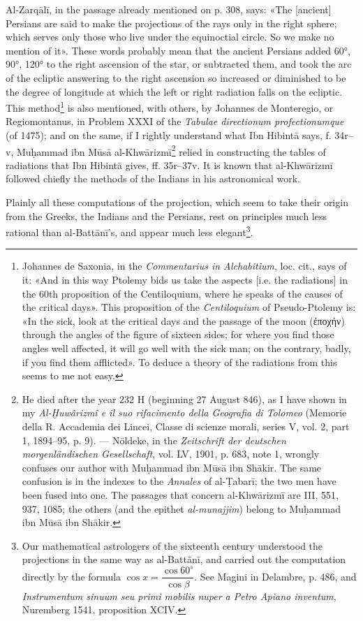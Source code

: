 \documentclass[11pt]{article}
\begin{document}
\par Al-Zarqālī, in the passage already mentioned on p. 308, says: «The [ancient] Persians are said to make the projections of the rays only in the right sphere; which serves only those who live under the equinoctial circle. So we make no mention of it». These words probably mean that the ancient Persians added 60°, 90°, 120° to the right ascension of the star, or subtracted them, and took the arc of the ecliptic answering to the right ascension so increased or diminished to be the degree of longitude at which the left or right radiation falls on the ecliptic. This method\footnote{Johannes de Saxonia, in the \emph{Commentarius in Alchabitium}, loc. cit., says of it: «And in this way Ptolemy bids us take the aspects [i.e. the radiations] in the 60th proposition of the Centiloquium, where he speaks of the causes of the critical days». This proposition of the \emph{Centiloquium} of Pseudo-Ptolemy is: «In the sick, look at the critical days and the passage of the moon ({\greekfont ἐποχήν}) through the angles of the figure of sixteen sides; for where you find those angles well affected, it will go well with the sick man; on the contrary, badly, if you find them afflicted». To deduce a theory of the radiations from this seems to me not easy.} is also mentioned, with others, by Johannes de Monteregio, or Regiomontanus, in Problem XXXI of the \emph{Tabulae directionum profectionumque} (of 1475); and on the same, if I rightly understand what Ibn Hibintā says, f. 34r–v, Muḥammad ibn Mūsā al-Khwārizmī\footnote{He died after the year 232 H (beginning 27 August 846), as I have shown in my \emph{Al-Ḫuwârizmî e il suo rifacimento della Geografia di Tolomeo} (Memorie della R. Accademia dei Lincei, Classe di scienze morali, series V, vol. 2, part 1, 1894–95, p. 9). — Nöldeke, in the \emph{Zeitschrift der deutschen morgenländischen Gesellschaft}, vol. LV, 1901, p. 683, note 1, wrongly confuses our author with Muḥammad ibn Mūsā ibn Shākir. The same confusion is in the indexes to the \emph{Annales} of al-Ṭabarī; the two men have been fused into one. The passages that concern al-Khwārizmī are III, 551, 937, 1085; the others (and the epithet \emph{al-munajjim}) belong to Muḥammad ibn Mūsā ibn Shākir.} relied in constructing the tables of radiations that Ibn Hibintā gives, ff. 35r–37v. It is known that al-Khwārizmī followed chiefly the methods of the Indians in his astronomical work.\par
\par Plainly all these computations of the projection, which seem to take their origin from the Greeks, the Indians and the Persians, rest on principles much less rational than al-Battānī's, and appear much less elegant\footnote{Our mathematical astrologers of the sixteenth century understood the projections in the same way as al-Battānī, and carried out the computation directly by the formula $\cos x = \dfrac{\cos 60^\circ}{\cos\beta}$. See Magini in Delambre, p. 486, and \emph{Instrumentum sinuum seu primi mobilis nuper a Petro Apiano inventum}, Nuremberg 1541, proposition XCIV.}.\par
\end{document}
